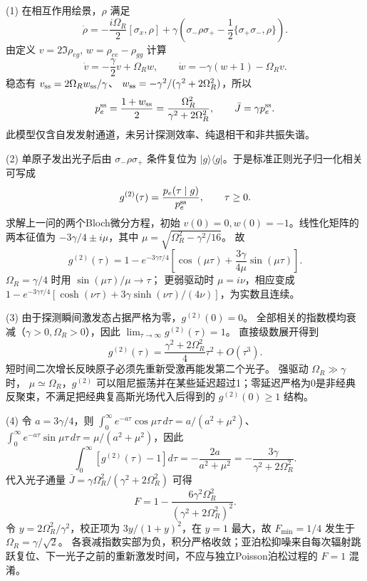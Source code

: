 (1) 在相互作用绘景，\(\rho\) 满足
\[
\dot\rho=-\frac{i\Omega_R}{2}[\sigma_x,\rho]
+\gamma\left(\sigma_-\rho\sigma_+
-\frac12\{\sigma_+\sigma_-,\rho\}\right).
\]
由定义 \(v=2\Im\rho_{eg},\,w=\rho_{ee}-\rho_{gg}\) 计算
\[
\dot v=-\frac\gamma2v+\Omega_Rw,\qquad
\dot w=-\gamma(w+1)-\Omega_Rv.
\]
稳态有 \(v_{\rm ss}=2\Omega_Rw_{\rm ss}/\gamma\)、
\(w_{\rm ss}=-\gamma^2/(\gamma^2+2\Omega_R^2)\)，所以
\[
p_e^{\rm ss}=\frac{1+w_{\rm ss}}2
=\frac{\Omega_R^2}{\gamma^2+2\Omega_R^2},
\qquad\bar J=\gamma p_e^{\rm ss}.
\]
此模型仅含自发发射通道，未另计探测效率、纯退相干和非共振失谐。

(2) 单原子发出光子后由 \(\sigma_-\rho\sigma_+\) 条件复位为
\(|g\rangle\langle g|\)。于是标准正则光子归一化相关可写成
\[
g^{(2)}(\tau)=\frac{p_e(\tau\mid g)}{p_e^{\rm ss}},\qquad\tau\ge0.
\]
求解上一问的两个Bloch微分方程，初始 \(v(0)=0,w(0)=-1\)。线性化矩阵的两本征值为
\(-3\gamma/4\pm i\mu\)，其中
\(\mu=\sqrt{\Omega_R^2-\gamma^2/16}\)。
故
\[
\boxed{g^{(2)}(\tau)=1-e^{-3\gamma\tau/4}
\left[\cos(\mu\tau)+\frac{3\gamma}{4\mu}\sin(\mu\tau)\right]}.
\]
\(\Omega_R=\gamma/4\) 时用 \(\sin(\mu\tau)/\mu\to\tau\)；
更弱驱动时 \(\mu=i\nu\)，相应变成
\(1-e^{-3\gamma\tau/4}[\cosh(\nu\tau)+3\gamma\sinh(\nu\tau)/(4\nu)]\)，为实数且连续。

(3) 由于探测瞬间激发态占据严格为零，\(g^{(2)}(0)=0\)。
全部相关的指数模均衰减（\(\gamma>0,\Omega_R>0\)），因此
\(\lim_{\tau\to\infty}g^{(2)}(\tau)=1\)。
直接级数展开得到
\[
g^{(2)}(\tau)=\frac{\gamma^2+2\Omega_R^2}{4}\tau^2+O(\tau^3).
\]
短时间二次增长反映原子必须先重新受激再能发第二个光子。
强驱动 \(\Omega_R\gg\gamma\) 时，
\(\mu\simeq\Omega_R\)，\(g^{(2)}\) 可以阻尼振荡并在某些延迟超过1；零延迟严格为0是非经典反聚束，不满足把经典复高斯光场代入后得到的 \(g^{(2)}(0)\ge1\) 结构。

(4) 令 \(a=3\gamma/4\)，则
\(\int_0^\infty e^{-a\tau}\cos\mu\tau\,d\tau=a/(a^2+\mu^2)\)、
\(\int_0^\infty e^{-a\tau}\sin\mu\tau\,d\tau=\mu/(a^2+\mu^2)\)，因此
\[
\int_0^\infty[g^{(2)}(\tau)-1]d\tau
=-\frac{2a}{a^2+\mu^2}
=-\frac{3\gamma}{\gamma^2+2\Omega_R^2}.
\]
代入光子通量 \(\bar J=\gamma\Omega_R^2/(\gamma^2+2\Omega_R^2)\) 可得
\[
\boxed{F=1-\frac{6\gamma^2\Omega_R^2}
{(\gamma^2+2\Omega_R^2)^2}}.
\]
令 \(y=2\Omega_R^2/\gamma^2\)，校正项为 \(3y/(1+y)^2\)，在 \(y=1\) 最大，故
\(F_{\min}=1/4\) 发生于 \(\Omega_R=\gamma/\sqrt2\)。
各衰减指数实部为负，积分严格收敛；亚泊松抑噪来自每次辐射跳跃复位、下一光子之前的重新激发时间，不应与独立Poisson泊松过程的 \(F=1\) 混淆。
